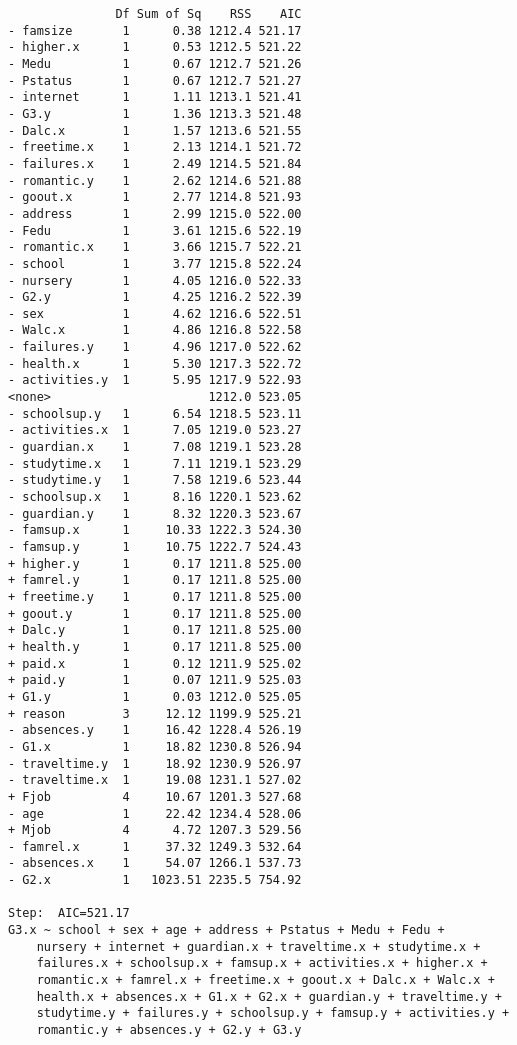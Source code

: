 \documentclass[11pt]{article}
\begin{document}
\begin{enumerate}
\begin{verbatim}
               Df Sum of Sq    RSS    AIC
- famsize       1      0.38 1212.4 521.17
- higher.x      1      0.53 1212.5 521.22
- Medu          1      0.67 1212.7 521.26
- Pstatus       1      0.67 1212.7 521.27
- internet      1      1.11 1213.1 521.41
- G3.y          1      1.36 1213.3 521.48
- Dalc.x        1      1.57 1213.6 521.55
- freetime.x    1      2.13 1214.1 521.72
- failures.x    1      2.49 1214.5 521.84
- romantic.y    1      2.62 1214.6 521.88
- goout.x       1      2.77 1214.8 521.93
- address       1      2.99 1215.0 522.00
- Fedu          1      3.61 1215.6 522.19
- romantic.x    1      3.66 1215.7 522.21
- school        1      3.77 1215.8 522.24
- nursery       1      4.05 1216.0 522.33
- G2.y          1      4.25 1216.2 522.39
- sex           1      4.62 1216.6 522.51
- Walc.x        1      4.86 1216.8 522.58
- failures.y    1      4.96 1217.0 522.62
- health.x      1      5.30 1217.3 522.72
- activities.y  1      5.95 1217.9 522.93
<none>                      1212.0 523.05
- schoolsup.y   1      6.54 1218.5 523.11
- activities.x  1      7.05 1219.0 523.27
- guardian.x    1      7.08 1219.1 523.28
- studytime.x   1      7.11 1219.1 523.29
- studytime.y   1      7.58 1219.6 523.44
- schoolsup.x   1      8.16 1220.1 523.62
- guardian.y    1      8.32 1220.3 523.67
- famsup.x      1     10.33 1222.3 524.30
- famsup.y      1     10.75 1222.7 524.43
+ higher.y      1      0.17 1211.8 525.00
+ famrel.y      1      0.17 1211.8 525.00
+ freetime.y    1      0.17 1211.8 525.00
+ goout.y       1      0.17 1211.8 525.00
+ Dalc.y        1      0.17 1211.8 525.00
+ health.y      1      0.17 1211.8 525.00
+ paid.x        1      0.12 1211.9 525.02
+ paid.y        1      0.07 1211.9 525.03
+ G1.y          1      0.03 1212.0 525.05
+ reason        3     12.12 1199.9 525.21
- absences.y    1     16.42 1228.4 526.19
- G1.x          1     18.82 1230.8 526.94
- traveltime.y  1     18.92 1230.9 526.97
- traveltime.x  1     19.08 1231.1 527.02
+ Fjob          4     10.67 1201.3 527.68
- age           1     22.42 1234.4 528.06
+ Mjob          4      4.72 1207.3 529.56
- famrel.x      1     37.32 1249.3 532.64
- absences.x    1     54.07 1266.1 537.73
- G2.x          1   1023.51 2235.5 754.92

Step:  AIC=521.17
G3.x ~ school + sex + age + address + Pstatus + Medu + Fedu + 
    nursery + internet + guardian.x + traveltime.x + studytime.x + 
    failures.x + schoolsup.x + famsup.x + activities.x + higher.x + 
    romantic.x + famrel.x + freetime.x + goout.x + Dalc.x + Walc.x + 
    health.x + absences.x + G1.x + G2.x + guardian.y + traveltime.y + 
    studytime.y + failures.y + schoolsup.y + famsup.y + activities.y + 
    romantic.y + absences.y + G2.y + G3.y


\end{verbatim}
\end{enumerate}
\end{document}
